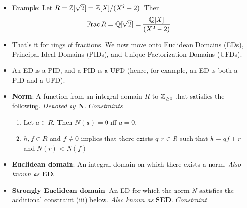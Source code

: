 \documentclass[../notes.tex]{subfiles}
\begin{document}
\begin{itemize}
\begin{proof}
        Background: Consider the injection $R\to F$. It sends every element of $D=R-\{0\}$ to a unit in $F$. Moreover, this function "factors through the fraction field" via Figure \ref{fig:fracDecomp} as per the theorem. We now begin the argument in earnest.\par
        To prove that $K\cong\Frac R$, we will use a bidirectional inclusion proof. For the forward direction, observe that $R\subset\Frac R\subset F$. Therefore, by the definition of $K$, $K\subset\Frac R$, as desired. For the backward direction, let $x/y\in\Frac R$ be arbitrary. To confirm that $x/y\in K$, it will suffice to verify that $x/y\in F'$ for all $R\subset F'\subset F$. Let $F'$ subject to said constraint be arbitrary. Since $x/y\in\Frac R$, $x,y\in R$. It follows since $R\subset F'$ that $x,y\in F'$. Thus, since $F'$ is a field and hence closed under multiplicative inverses, $1/y\in F'$. Finally, since $F'$ is closed under multiplication and $x,1/y\in F'$, we have that $x/y\in F'$, as desired.
    \end{proof}
    \item Example: Let $R=\mathbb{Z}[\sqrt{2}]=\mathbb{Z}[X]/(X^2-2)$. Then
    \begin{equation*}
        \operatorname{Frac} R = \mathbb{Q}[\sqrt{2}] = \frac{\mathbb{Q}[X]}{(X^2-2)}
    \end{equation*}
    \item That's it for rings of fractions. We now move onto Euclidean Domains (EDs), Principal Ideal Domains (PIDs), and Unique Factorization Domains (UFDs).
    \item An ED is a PID, and a PID is a UFD (hence, for example, an ED is both a PID and a UFD).
    \item \textbf{Norm}: A function from an integral domain $R$ to ${\mathbb{Z}_{\geq 0}}$ that satisfies the following. \emph{Denoted by} $\bm{N}$. \emph{Constraints}
    \begin{enumerate}[label={(\roman*)}]
        \item Let $a\in R$. Then $N(a)=0$ iff $a=0$.
        \item $h,f\in R$ and $f\neq 0$ implies that there exists $q,r\in R$ such that $h=qf+r$ and $N(r)<N(f)$.
    \end{enumerate}
    \item \textbf{Euclidean domain}: An integral domain on which there exists a norm. \emph{Also known as} \textbf{ED}.
    \item \textbf{Strongly Euclidean domain}: An ED for which the norm $N$ satisfies the additional constraint (iii) below. \emph{Also known as} \textbf{SED}. \emph{Constraint}

\end{itemize}
\end{document}
